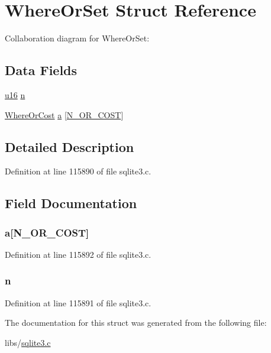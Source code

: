 \hypertarget{struct_where_or_set}{}\section{Where\+Or\+Set Struct Reference}
\label{struct_where_or_set}


Collaboration diagram for Where\+Or\+Set\+:
\subsection*{Data Fields}
\begin{DoxyCompactItemize}
\item 
\hyperlink{sqlite3_8c_a20f2299e322dcbde37cb07b16910b843}{u16} \hyperlink{struct_where_or_set_a5ec4fd0e024bc32c98f81aa70b5f8dbe}{n}
\item 
\hyperlink{struct_where_or_cost}{Where\+Or\+Cost} \hyperlink{struct_where_or_set_a17b1a2780c7946d92a30de603ae2652f}{a} \mbox{[}\hyperlink{sqlite3_8c_ae179b4f194f8e9a7e6f89b70e1def485}{N\+\_\+\+O\+R\+\_\+\+C\+O\+S\+T}\mbox{]}
\end{DoxyCompactItemize}


\subsection{Detailed Description}


Definition at line 115890 of file sqlite3.\+c.



\subsection{Field Documentation}
\hypertarget{struct_where_or_set_a17b1a2780c7946d92a30de603ae2652f}{}
\subsubsection[{a}]{ a\mbox{[}{\bf N\+\_\+\+O\+R\+\_\+\+C\+O\+S\+T}\mbox{]}}\label{struct_where_or_set_a17b1a2780c7946d92a30de603ae2652f}


Definition at line 115892 of file sqlite3.\+c.

\hypertarget{struct_where_or_set_a5ec4fd0e024bc32c98f81aa70b5f8dbe}{}
\subsubsection[{n}]{ n}\label{struct_where_or_set_a5ec4fd0e024bc32c98f81aa70b5f8dbe}


Definition at line 115891 of file sqlite3.\+c.



The documentation for this struct was generated from the following file\+:\begin{DoxyCompactItemize}
\item 
libs/\hyperlink{sqlite3_8c}{sqlite3.\+c}\end{DoxyCompactItemize}
